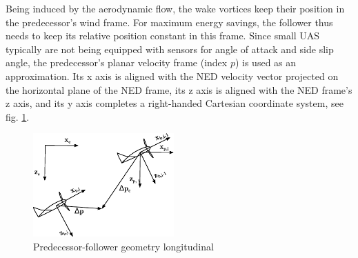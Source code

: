 \documentclass{ifacconf}
\begin{document}
Being induced by the aerodynamic flow, the wake vortices keep their position in the predecessor's wind frame. For maximum energy savings, the follower thus needs to keep its relative position constant in this frame. Since small UAS typically are not being equipped with sensors for angle of attack and side slip angle, the predecessor's planar velocity frame (index $p$) is used as an approximation. Its x axis is aligned with the NED velocity vector projected on the horizontal plane of the NED frame, its z axis is aligned with the NED frame's z axis, and its y axis completes a right-handed Cartesian coordinate system, see fig. \ref{fig:frames}. 
\begin{figure}
\begin{center}
\includegraphics[width=5.4cm]{frames.pdf}    %
\caption{Predecessor-follower geometry longitudinal}
\label{fig:frames}
\end{center}
\end{figure}
\end{document}
